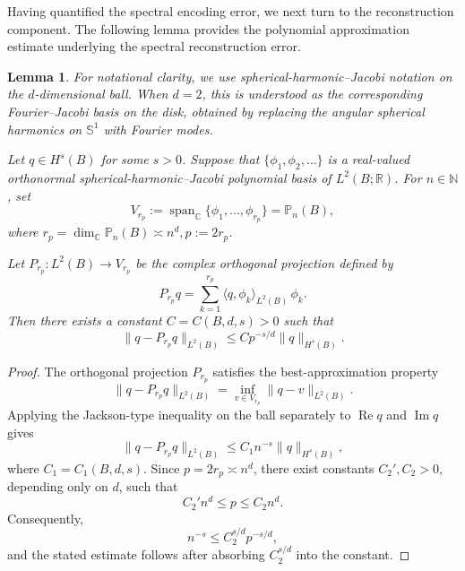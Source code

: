\documentclass{article}
\numberwithin{equation}{section}
\theoremstyle{plain}
\newtheorem{lemma}{Lemma}[section]
\begin{document}
    Having quantified the spectral encoding error, we next turn to the reconstruction component. The following lemma provides the polynomial approximation estimate underlying the spectral reconstruction error.
	\begin{lemma}\label{lem:ball-polynomial-approx}
		For notational clarity, we use spherical-harmonic--Jacobi notation on the
		$d$-dimensional ball.  When $d=2$, this is understood as the corresponding
		Fourier--Jacobi basis on the disk, obtained by replacing the angular spherical
		harmonics on $\mathbb S^1$ with Fourier modes.
		
		Let $q\in H^s(B)$ for some $s>0$.
		Suppose that $\{\phi_1,\phi_2,\dots\}$ is a real-valued orthonormal
		spherical-harmonic--Jacobi polynomial basis of $L^2(B;\mathbb R)$.
		For $n\in\mathbb N$, set
		\begin{equation*}
		V_{r_p}
		:=
		\operatorname{span}_{\mathbb C}\{\phi_1,\dots,\phi_{r_p}\}
		=
		\mathbb P_n(B),
		\end{equation*}
		where
		$
		r_p
		=
		\dim_{\mathbb C}\mathbb P_n(B)
		\asymp n^d,
		p:=2r_p
		$.
		
		Let $P_{r_p}:L^2(B)\to V_{r_p}$ be the complex
		orthogonal projection defined by
		\begin{equation*}
		P_{r_p}q
		=
		\sum_{k=1}^{r_p}
		\langle q,\phi_k\rangle_{L^2(B)}\,\phi_k.
		\end{equation*}
		Then there exists a constant $C=C(B,d,s)>0$ such that
		\begin{equation*}
		\|q-P_{r_p}q\|_{L^2(B)}
		\le
		Cp^{-s/d}\|q\|_{H^s(B)}.
		\end{equation*}
	\end{lemma}
	
	\begin{proof}
		The orthogonal projection $P_{r_p}$ satisfies the best-approximation
		property
		\begin{equation*}
		\|q-P_{r_p}q\|_{L^2(B)}
		=
		\inf_{v\in V_{r_p}}\|q-v\|_{L^2(B)}.
		\end{equation*}
		Applying the Jackson-type inequality on the ball \cite{DL93}
		separately to $\operatorname{Re}q$ and $\operatorname{Im}q$ gives
		\begin{equation*}
		\|q-P_{r_p}q\|_{L^2(B)}
		\le
		C_1n^{-s}\|q\|_{H^s(B)},
		\end{equation*}
		where $C_1=C_1(B,d,s)$. Since $p=2r_p\asymp n^d$, there
		exist constants $C_2',C_2>0$, depending only on $d$, such that
		\begin{equation*}
		C_2'n^d\le p\le C_2n^d.
		\end{equation*}
		Consequently,
		\begin{equation*}
		n^{-s}\le C_2^{s/d}p^{-s/d},
		\end{equation*}
		and the stated estimate follows after absorbing $C_2^{s/d}$ into the constant.
	\end{proof}
	
\end{document}
